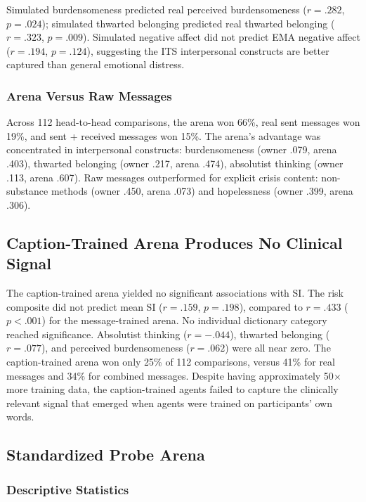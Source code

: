 \documentclass[review,12pt,authoryear]{elsarticle}
\begin{document}
Simulated burdensomeness predicted real perceived burdensomeness ($r = .282$, $p = .024$); simulated thwarted belonging predicted real thwarted belonging ($r = .323$, $p = .009$). Simulated negative affect did not predict EMA negative affect ($r = .194$, $p = .124$), suggesting the ITS interpersonal constructs are better captured than general emotional distress.

\subsubsection{Arena Versus Raw Messages}

Across 112 head-to-head comparisons, the arena won 66\%, real sent messages won 19\%, and sent + received messages won 15\%. The arena's advantage was concentrated in interpersonal constructs: burdensomeness (owner .079, arena .403), thwarted belonging (owner .217, arena .474), absolutist thinking (owner .113, arena .607). Raw messages outperformed for explicit crisis content: non-substance methods (owner .450, arena .073) and hopelessness (owner .399, arena .306).

\subsection{Caption-Trained Arena Produces No Clinical Signal}

The caption-trained arena yielded no significant associations with SI. The risk composite did not predict mean SI ($r = .159$, $p = .198$), compared to $r = .433$ ($p < .001$) for the message-trained arena. No individual dictionary category reached significance. Absolutist thinking ($r = -.044$), thwarted belonging ($r = .077$), and perceived burdensomeness ($r = .062$) were all near zero. The caption-trained arena won only 25\% of 112 comparisons, versus 41\% for real messages and 34\% for combined messages. Despite having approximately 50$\times$ more training data, the caption-trained agents failed to capture the clinically relevant signal that emerged when agents were trained on participants' own words.

\subsection{Standardized Probe Arena}

\subsubsection{Descriptive Statistics}
\end{document}
